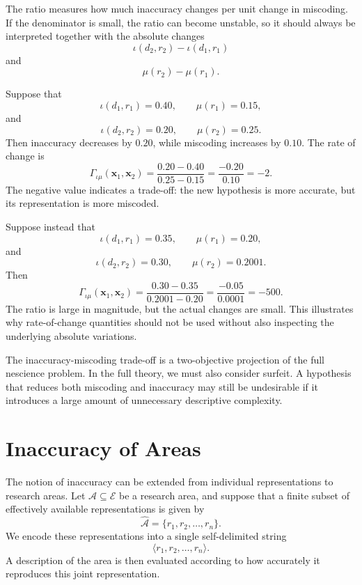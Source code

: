 The ratio measures how much inaccuracy changes per unit change in miscoding. If the denominator is small, the ratio can become unstable, so it should always be interpreted together with the absolute changes
\[
\iota(d_2,r_2)-\iota(d_1,r_1)
\]
and
\[
\mu(r_2)-\mu(r_1).
\]

\begin{example}
Suppose that
\[
\iota(d_1,r_1)=0.40,
\qquad
\mu(r_1)=0.15,
\]
and
\[
\iota(d_2,r_2)=0.20,
\qquad
\mu(r_2)=0.25.
\]
Then inaccuracy decreases by \(0.20\), while miscoding increases by \(0.10\). The rate of change is
\[
\Gamma_{\iota\mu}(\mathbf{x}_1,\mathbf{x}_2)
=
\frac{0.20-0.40}{0.25-0.15}
=
\frac{-0.20}{0.10}
=
-2.
\]
The negative value indicates a trade-off: the new hypothesis is more accurate, but its representation is more miscoded.
\end{example}

\begin{example}
Suppose instead that
\[
\iota(d_1,r_1)=0.35,
\qquad
\mu(r_1)=0.20,
\]
and
\[
\iota(d_2,r_2)=0.30,
\qquad
\mu(r_2)=0.2001.
\]
Then
\[
\Gamma_{\iota\mu}(\mathbf{x}_1,\mathbf{x}_2)
=
\frac{0.30-0.35}{0.2001-0.20}
=
\frac{-0.05}{0.0001}
=
-500.
\]
The ratio is large in magnitude, but the actual changes are small. This illustrates why rate-of-change quantities should not be used without also inspecting the underlying absolute variations.
\end{example}

The inaccuracy-miscoding trade-off is a two-objective projection of the full nescience problem. In the full theory, we must also consider surfeit. A hypothesis that reduces both miscoding and inaccuracy may still be undesirable if it introduces a large amount of unnecessary descriptive complexity.

%
%

\section{Inaccuracy of Areas}
\label{sec:inaccuracy_areas}

The notion of inaccuracy can be extended from individual representations to research areas. Let \(\mathcal A\subseteq \mathcal E\) be a research area, and suppose that a finite subset of effectively available representations is given by
\[
\widehat{\mathcal A}
=
\{r_1,r_2,\ldots,r_n\}.
\]
We encode these representations into a single self-delimited string
\[
\langle r_1,r_2,\ldots,r_n\rangle.
\]
A description of the area is then evaluated according to how accurately it reproduces this joint representation.

